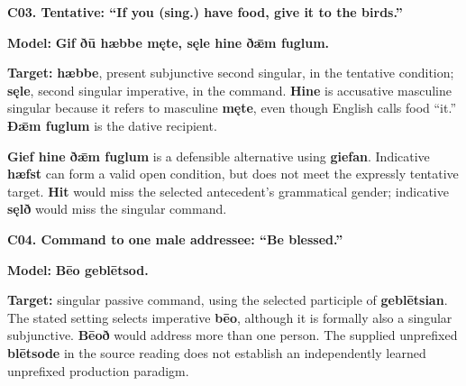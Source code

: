 \par\begin{minipage}{\linewidth}\raggedright
\textbf{C03. Tentative: “If you (sing.) have food, give it to the birds.”}

\textbf{Model:} \textbf{Gif ðū hæbbe męte, sęle hine ðǣm fuglum.}

\textbf{Target:} \textbf{hæbbe}, present subjunctive second singular, in the tentative condition; \textbf{sęle}, second singular imperative, in the command. \textbf{Hine} is accusative masculine singular because it refers to masculine \textbf{męte}, even though English calls food “it.” \textbf{Ðǣm fuglum} is the dative recipient.

\textbf{Gief hine ðǣm fuglum} is a defensible alternative using \textbf{giefan}. Indicative \textbf{hæfst} can form a valid open condition, but does not meet the expressly tentative target. \textbf{Hit} would miss the selected antecedent’s grammatical gender; indicative \textbf{sęlð} would miss the singular command.

\end{minipage}\par\addvspace{4pt}

\par\begin{minipage}{\linewidth}\raggedright
\textbf{C04. Command to one male addressee: “Be blessed.”}

\textbf{Model:} \textbf{Bēo geblētsod.}

\textbf{Target:} singular passive command, using the selected participle of \textbf{geblētsian}. The stated setting selects imperative \textbf{bēo}, although it is formally also a singular subjunctive. \textbf{Bēoð} would address more than one person. The supplied unprefixed \textbf{blētsode} in the source reading does not establish an independently learned unprefixed production paradigm.

\end{minipage}\par\addvspace{4pt}

